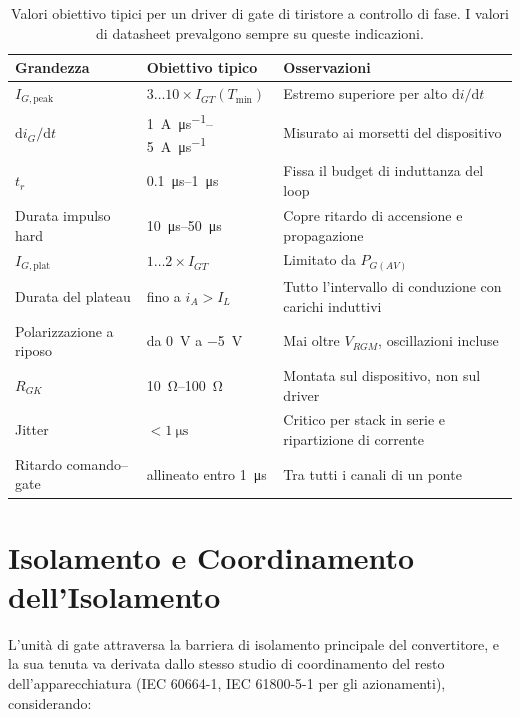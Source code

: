 \documentclass[11pt,a4paper]{article}
\begin{document}
\begin{table}[htbp]
\centering
\caption{Valori obiettivo tipici per un driver di gate di tiristore a controllo di
fase. I valori di datasheet prevalgono sempre su queste indicazioni.}
\label{tab:targets}
\begin{tabular}{@{}llp{6.4cm}@{}}
\toprule
\textbf{Grandezza} & \textbf{Obiettivo tipico} & \textbf{Osservazioni} \\
\midrule
$I_{G,\text{peak}}$ & $3\dots10\times I_{GT}(T_{\min})$ &
  Estremo superiore per alto $\mathrm{d}i/\mathrm{d}t$ \\
$\mathrm{d}i_G/\mathrm{d}t$ & \SIrange{1}{5}{\ampere\per\micro\second} &
  Misurato ai morsetti del dispositivo \\
$t_r$ & \SIrange{0.1}{1}{\micro\second} & Fissa il budget di induttanza del loop \\
Durata impulso hard & \SIrange{10}{50}{\micro\second} & Copre ritardo di accensione e propagazione \\
$I_{G,\text{plat}}$ & $1\dots2\times I_{GT}$ & Limitato da $P_{G(AV)}$ \\
Durata del plateau & fino a $i_A > I_L$ &
  Tutto l'intervallo di conduzione con carichi induttivi \\
Polarizzazione a riposo & da \SI{0}{\volt} a \SI{-5}{\volt} &
  Mai oltre $V_{RGM}$, oscillazioni incluse \\
$R_{GK}$ & \SIrange{10}{100}{\ohm} & Montata sul dispositivo, non sul driver \\
Jitter & $< \SI{1}{\micro\second}$ &
  Critico per stack in serie e ripartizione di corrente \\
Ritardo comando--gate & allineato entro \SI{1}{\micro\second} &
  Tra tutti i canali di un ponte \\
\bottomrule
\end{tabular}
\end{table}

\section{Isolamento e Coordinamento dell'Isolamento}

L'unità di gate attraversa la barriera di isolamento principale del convertitore, e
la sua tenuta va derivata dallo stesso studio di coordinamento del resto
dell'apparecchiatura (IEC 60664-1, IEC 61800-5-1 per gli azionamenti), considerando:
\end{document}
